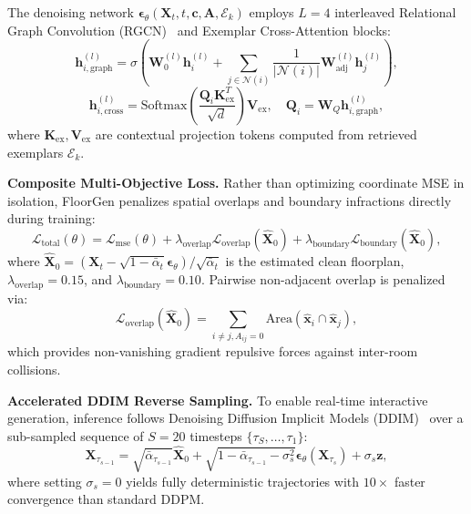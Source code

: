 \documentclass[journal]{IEEEtran}
\begin{document}
The denoising network $\boldsymbol{\epsilon}_\theta(\mathbf{X}_t, t, \mathbf{c}, \mathbf{A}, \mathcal{E}_k)$ employs $L=4$ interleaved Relational Graph Convolution (RGCN)~\cite{schlichtkrull2018modeling} and Exemplar Cross-Attention blocks:
\begin{equation}
\mathbf{h}_{i,\mathrm{graph}}^{(l)} = \sigma\left(\mathbf{W}_0^{(l)} \mathbf{h}_i^{(l)} + \sum_{j \in \mathcal{N}(i)} \frac{1}{|\mathcal{N}(i)|} \mathbf{W}_{\mathrm{adj}}^{(l)} \mathbf{h}_j^{(l)}\right),
\end{equation}
\begin{equation}
\mathbf{h}_{i,\mathrm{cross}}^{(l)} = \mathrm{Softmax}\left(\frac{\mathbf{Q}_i \mathbf{K}_{\mathrm{ex}}^T}{\sqrt{d}}\right) \mathbf{V}_{\mathrm{ex}}, \quad \mathbf{Q}_i = \mathbf{W}_Q \mathbf{h}_{i,\mathrm{graph}}^{(l)},
\end{equation}
where $\mathbf{K}_{\mathrm{ex}}, \mathbf{V}_{\mathrm{ex}}$ are contextual projection tokens computed from retrieved exemplars $\mathcal{E}_k$.

\noindent\textbf{Composite Multi-Objective Loss.} Rather than optimizing coordinate MSE in isolation, FloorGen penalizes spatial overlaps and boundary infractions directly during training:
\begin{equation}
\mathcal{L}_{\mathrm{total}}(\theta) = \mathcal{L}_{\mathrm{mse}}(\theta) + \lambda_{\mathrm{overlap}} \mathcal{L}_{\mathrm{overlap}}(\hat{\mathbf{X}}_0) + \lambda_{\mathrm{boundary}} \mathcal{L}_{\mathrm{boundary}}(\hat{\mathbf{X}}_0),
\label{eq:composite_loss}
\end{equation}
where $\hat{\mathbf{X}}_0 = (\mathbf{X}_t - \sqrt{1 - \bar{\alpha}_t}\boldsymbol{\epsilon}_\theta) / \sqrt{\bar{\alpha}_t}$ is the estimated clean floorplan, $\lambda_{\mathrm{overlap}} = 0.15$, and $\lambda_{\mathrm{boundary}} = 0.10$. Pairwise non-adjacent overlap is penalized via:
\begin{equation}
\mathcal{L}_{\mathrm{overlap}}(\hat{\mathbf{X}}_0) = \sum_{i \neq j, A_{ij}=0} \mathrm{Area}\left(\hat{\mathbf{x}}_i \cap \hat{\mathbf{x}}_j\right),
\end{equation}
which provides non-vanishing gradient repulsive forces against inter-room collisions.

\noindent\textbf{Accelerated DDIM Reverse Sampling.} To enable real-time interactive generation, inference follows Denoising Diffusion Implicit Models (DDIM)~\cite{song2020denoising} over a sub-sampled sequence of $S=20$ timesteps $\{\tau_S, \dots, \tau_1\}$:
\begin{equation}
\mathbf{X}_{\tau_{s-1}} = \sqrt{\bar{\alpha}_{\tau_{s-1}}}\hat{\mathbf{X}}_0 + \sqrt{1 - \bar{\alpha}_{\tau_{s-1}} - \sigma_s^2} \boldsymbol{\epsilon}_\theta(\mathbf{X}_{\tau_s}) + \sigma_s \mathbf{z},
\end{equation}
where setting $\sigma_s = 0$ yields fully deterministic trajectories with $10\times$ faster convergence than standard DDPM.
\end{document}
